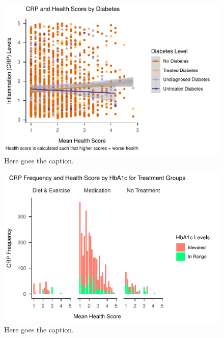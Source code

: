 \documentclass[
  man]{apa6}
\begin{document}
\begin{figure}
\centering
\includegraphics{NEW_Final_Groupof5_files/figure-latex/appendix-fig1-1.pdf}
\caption{\label{fig:appendix-fig1}Here goes the caption.}
\end{figure}





\begin{figure}
\centering
\includegraphics{NEW_Final_Groupof5_files/figure-latex/appendix-fig3-1.pdf}
\caption{\label{fig:appendix-fig3}Here goes the caption.}
\end{figure}
\end{document}
